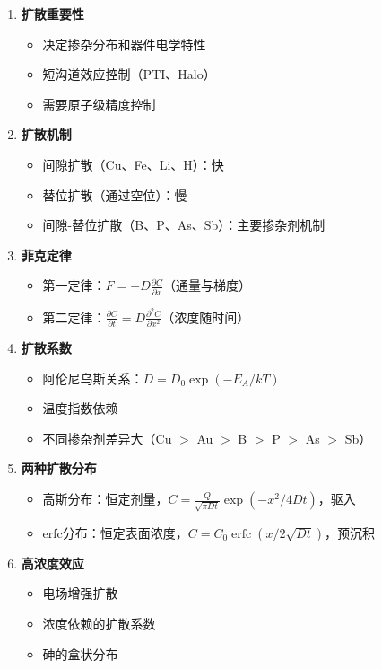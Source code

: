 \documentclass[UTF8,12pt,a4paper]{ctexart}
\begin{document}
\begin{enumerate}
    \item \textbf{扩散重要性}
    \begin{itemize}
        \item 决定掺杂分布和器件电学特性
        \item 短沟道效应控制（PTI、Halo）
        \item 需要原子级精度控制
    \end{itemize}
    
    \item \textbf{扩散机制}
    \begin{itemize}
        \item 间隙扩散（Cu、Fe、Li、H）：快
        \item 替位扩散（通过空位）：慢
        \item 间隙-替位扩散（B、P、As、Sb）：主要掺杂剂机制
    \end{itemize}
    
    \item \textbf{菲克定律}
    \begin{itemize}
        \item 第一定律：$F = -D\frac{\partial C}{\partial x}$（通量与梯度）
        \item 第二定律：$\frac{\partial C}{\partial t} = D\frac{\partial^2 C}{\partial x^2}$（浓度随时间）
    \end{itemize}
    
    \item \textbf{扩散系数}
    \begin{itemize}
        \item 阿伦尼乌斯关系：$D = D_0\exp(-E_A/kT)$
        \item 温度指数依赖
        \item 不同掺杂剂差异大（Cu $>$ Au $>$ B $>$ P $>$ As $>$ Sb）
    \end{itemize}
    
    \item \textbf{两种扩散分布}
    \begin{itemize}
        \item 高斯分布：恒定剂量，$C = \frac{Q}{\sqrt{\pi Dt}}\exp(-x^2/4Dt)$，驱入
        \item erfc分布：恒定表面浓度，$C = C_0\operatorname{erfc}(x/2\sqrt{Dt})$，预沉积
    \end{itemize}
    
    \item \textbf{高浓度效应}
    \begin{itemize}
        \item 电场增强扩散
        \item 浓度依赖的扩散系数
        \item 砷的盒状分布
    \end{itemize}
    

\end{enumerate}
\end{document}
